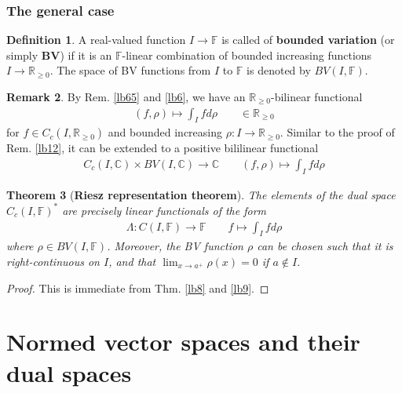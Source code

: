 \documentclass[12pt,b5paper,notitlepage]{article}
\theoremstyle{definition}
\newtheorem{df}{Definition}[section]
\newtheorem{rem}[df]{Remark}
\theoremstyle{plain}
\newtheorem{thm}[df]{Theorem}
\newcommand{\Cbb}{\mathbb C}
\newcommand{\Rbb}{\mathbb R}
\newcommand{\Fbb}{\mathbb F}
\numberwithin{equation}{section}
\begin{document}
\subsubsection{The general case}


\begin{df}
 A real-valued function $I\rightarrow\Fbb$ is called of \textbf{bounded variation} (or simply \textbf{BV})  if it is an $\Fbb$-linear combination of bounded increasing functions $I\rightarrow\Rbb_{\geq0}$. The space of BV functions from $I$ to $\Fbb$ is denoted by $BV(I,\Fbb)$. \index{BV@$BV(I,\Fbb)$}
\end{df}

\begin{rem}
By Rem. \ref{lb65} and \ref{lb6}, we have an $\Rbb_{\geq0}$-bilinear functional
\begin{align*}
(f,\rho)\mapsto \int_I fd\rho\qquad\in\Rbb_{\geq0}
\end{align*}
for $f\in C_c(I,\Rbb_{\geq0})$ and bounded increasing $\rho:I\rightarrow\Rbb_{\geq0}$. Similar to the proof of Rem. \ref{lb12}, it can be extended to a positive bililinear functional 
\begin{align*}
C_c(I,\Cbb)\times BV(I,\Cbb)\rightarrow\Cbb\qquad (f,\rho)\mapsto \int_I fd\rho
\end{align*}
\end{rem}


\begin{thm}[\textbf{Riesz representation theorem}]\label{lb10}
The elements of the dual space $C_c(I,\Fbb)^*$ are precisely linear functionals of the form
\begin{gather*}
\Lambda:C(I,\Fbb)\rightarrow\Fbb\qquad f\mapsto\int_I fd\rho
\end{gather*}
where $\rho\in BV(I,\Fbb)$. Moreover, the BV function $\rho$ can be chosen such that it is right-continuous on $I$, and that $\lim_{x\rightarrow a^+}\rho(x)=0$ if $a\notin I$.
\end{thm}

\begin{proof}
This is immediate from Thm. \ref{lb8} and \ref{lb9}.
\end{proof}







\newpage


\section{Normed vector spaces and their dual spaces}
\end{document}

